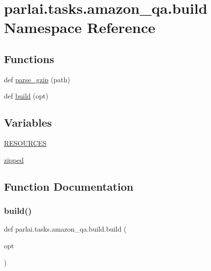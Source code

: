 \hypertarget{namespaceparlai_1_1tasks_1_1amazon__qa_1_1build}{}\section{parlai.\+tasks.\+amazon\+\_\+qa.\+build Namespace Reference}
\label{namespaceparlai_1_1tasks_1_1amazon__qa_1_1build}
\subsection*{Functions}
\begin{DoxyCompactItemize}
\item 
def \hyperlink{namespaceparlai_1_1tasks_1_1amazon__qa_1_1build_a4dc970e3684ff021439ed7e158c4da35}{parse\+\_\+gzip} (path)
\item 
def \hyperlink{namespaceparlai_1_1tasks_1_1amazon__qa_1_1build_af4967ce0e07a39c04a279d99e037124d}{build} (opt)
\end{DoxyCompactItemize}
\subsection*{Variables}
\begin{DoxyCompactItemize}
\item 
\hyperlink{namespaceparlai_1_1tasks_1_1amazon__qa_1_1build_a59f5bdb6195436f1309146ea17e7ff07}{R\+E\+S\+O\+U\+R\+C\+ES}
\item 
\hyperlink{namespaceparlai_1_1tasks_1_1amazon__qa_1_1build_a5579717834de5ddc11ed13cd425e8cbe}{zipped}
\end{DoxyCompactItemize}


\subsection{Function Documentation}
\mbox{\label{namespaceparlai_1_1tasks_1_1amazon__qa_1_1build_af4967ce0e07a39c04a279d99e037124d}} 
\subsubsection{\texorpdfstring{build()}{build()}}
{\footnotesize\ttfamily def parlai.\+tasks.\+amazon\+\_\+qa.\+build.\+build (\begin{DoxyParamCaption}\item[{}]{opt }\end{DoxyParamCaption})}



